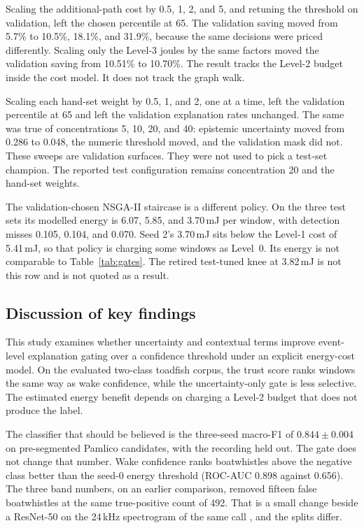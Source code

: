 \documentclass[sn-mathphys-num]{sn-jnl}%
\theoremstyle{thmstyleone}%
\theoremstyle{thmstyletwo}%
\theoremstyle{thmstylethree}%
\begin{document}
Scaling the additional-path cost by 0.5, 1, 2, and 5, and retuning the threshold on validation, left the chosen percentile at 65. The validation saving moved from 5.7\% to 10.5\%, 18.1\%, and 31.9\%, because the same decisions were priced differently. Scaling only the Level-3 joules by the same factors moved the validation saving from 10.51\% to 10.70\%. The result tracks the Level-2 budget inside the cost model. It does not track the graph walk.

Scaling each hand-set weight by 0.5, 1, and 2, one at a time, left the validation percentile at 65 and left the validation explanation rates unchanged. The same was true of concentrations 5, 10, 20, and 40: epistemic uncertainty moved from 0.286 to 0.048, the numeric threshold moved, and the validation mask did not. These sweeps are validation surfaces. They were not used to pick a test-set champion. The reported test configuration remains concentration 20 and the hand-set weights.

The validation-chosen NSGA-II staircase is a different policy. On the three test sets its modelled energy is 6.07, 5.85, and 3.70\,mJ per window, with detection misses 0.105, 0.104, and 0.070. Seed 2's 3.70\,mJ sits below the Level-1 cost of 5.41\,mJ, so that policy is charging some windows as Level~0. Its energy is not comparable to Table~\ref{tab:gates}. The retired test-tuned knee at 3.82\,mJ is not this row and is not quoted as a result.

\subsection{Discussion of key findings}\label{sec:discussion}

This study examines whether uncertainty and contextual terms improve event-level explanation gating over a confidence threshold under an explicit energy-cost model. On the evaluated two-class toadfish corpus, the trust score ranks windows the same way as wake confidence, while the uncertainty-only gate is less selective. The estimated energy benefit depends on charging a Level-2 budget that does not produce the label.

The classifier that should be believed is the three-seed macro-F1 of $0.844 \pm 0.004$ on pre-segmented Pamlico candidates, with the recording held out. The gate does not change that number. Wake confidence ranks boatwhistles above the negative class better than the seed-0 energy threshold (ROC-AUC 0.898 against 0.656). The three band numbers, on an earlier comparison, removed fifteen false boatwhistles at the same true-positive count of 492. That is a small change beside a ResNet-50 on the 24\,kHz spectrogram of the same call \cite{bohnenstiehl2023}, and the splits differ.
\end{document}
